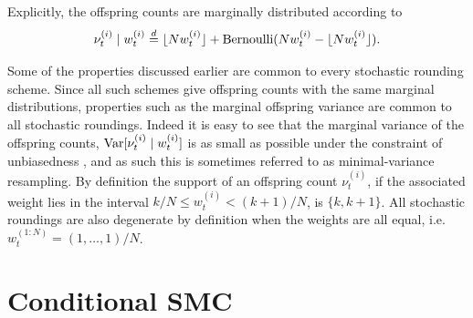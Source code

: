 Explicitly, the offspring counts are marginally distributed according to 
\begin{equation*}
\nu_t^{(i)} \mid w_t^{(i)}
\overset{d}{=} \lfloor N w_t^{(i)} \rfloor + \operatorname{Bernoulli}( Nw_t^{(i)} - \lfloor N w_t^{(i)} \rfloor ) .
\end{equation*}

Some of the properties discussed earlier are common to every stochastic rounding scheme. 
Since all such schemes give offspring counts with the same marginal distributions, properties such as the marginal offspring variance are common to all stochastic roundings. Indeed it is easy to see that the marginal variance of the offspring counts, $\operatorname{Var}[ \nu_t^{(i)} \mid w_t^{(i)} ]$ is as small as possible under the constraint of unbiasedness , and as such this is sometimes referred to as minimal-variance resampling.
By definition the support of an offspring count $\nu_t^{(i)}$, if the associated weight lies in the interval $k/N \leq w_t^{(i)} < (k+1)/N$, is $\{ k, k+1\}$. 
All stochastic roundings are also degenerate by definition when the weights are all equal, i.e.\ $w_t^{(1:N)} = (1,\dots, 1)/N$.





\section{Conditional SMC \seb{$\sim$} }

%
%
%

